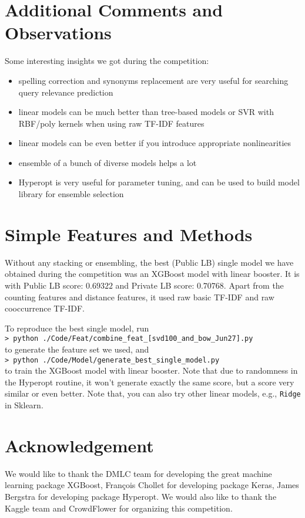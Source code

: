 \documentclass[12pt]{article}
\begin{document}
\section{Additional Comments and Observations}
Some interesting insights we got during the competition:
\begin{itemize}
\item spelling correction and synonyms replacement are very useful for searching query relevance prediction
\item linear models can be much better than tree-based models or SVR with RBF/poly kernels when using raw TF-IDF features
\item linear models can be even better if you introduce appropriate nonlinearities
\item ensemble of a bunch of diverse models helps a lot
\item Hyperopt is very useful for parameter tuning, and can be used to build model library for ensemble selection
\end{itemize}

\section{Simple Features and Methods}
Without any stacking or ensembling, the best (Public LB) single model we have obtained during the competition was an XGBoost model with linear booster. It is with Public LB score: $0.69322$ and Private LB score: $0.70768$. Apart from the counting features and distance features, it used raw basic TF-IDF and raw cooccurrence TF-IDF.

To reproduce the best single model, run\\
\texttt{> python ./Code/Feat/combine\_feat\_[svd100\_and\_bow\_Jun27].py}\\
to generate the feature set we used, and\\
\texttt{> python ./Code/Model/generate\_best\_single\_model.py}\\
to train the XGBoost model with linear booster. Note that due to randomness in the Hyperopt routine, it won't generate exactly the same score, but a score very similar or even better. Note that, you can also try other linear models, e.g., \texttt{Ridge} in Sklearn.

\section{Acknowledgement}
We would like to thank the DMLC team for developing the great machine learning package XGBoost, Fran\c{c}ois Chollet for developing package Keras, James Bergstra for developing package Hyperopt. We would also like to thank the Kaggle team and CrowdFlower for organizing this competition.



\end{document}
